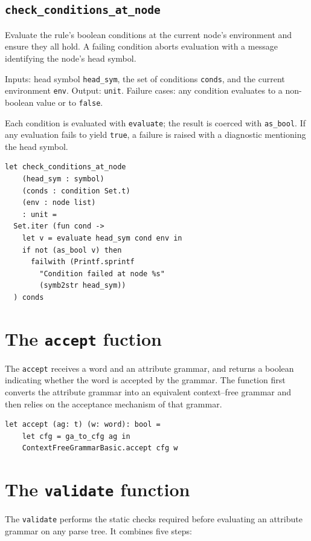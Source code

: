 \subsection{\texttt{check\_conditions\_at\_node}}

Evaluate the rule's boolean conditions at the current node's environment and ensure they all hold. A failing condition aborts evaluation with a message 
identifying the node's head symbol. 

Inputs: head symbol \texttt{head\_sym}, the set of conditions \texttt{conds}, and the current environment \texttt{env}.  
Output: \texttt{unit}.  
Failure cases: any condition evaluates to a non-boolean value or to \texttt{false}. 

Each condition is evaluated with \texttt{evaluate}; the result is coerced with \texttt{as\_bool}. If any evaluation fails to yield \texttt{true}, 
a failure is raised with a diagnostic mentioning the head symbol. 

\begin{verbatim}
let check_conditions_at_node
    (head_sym : symbol)
    (conds : condition Set.t)
    (env : node list)
    : unit =
  Set.iter (fun cond ->
    let v = evaluate head_sym cond env in
    if not (as_bool v) then
      failwith (Printf.sprintf
        "Condition failed at node %s"
        (symb2str head_sym))
  ) conds
\end{verbatim}


\section{The \texttt{accept} fuction}

The \texttt{accept} receives
a word and an attribute grammar, and returns a boolean indicating whether the word
is accepted by the grammar. The function first converts the attribute grammar into an
equivalent context--free grammar and then relies on the acceptance mechanism of that
grammar.

\begin{verbatim}
let accept (ag: t) (w: word): bool =
    let cfg = ga_to_cfg ag in
    ContextFreeGrammarBasic.accept cfg w
\end{verbatim}



\section{ The \texttt{validate} function}
The \texttt{validate} performs the static checks required before evaluating an attribute grammar on any parse tree. It combines five steps:

